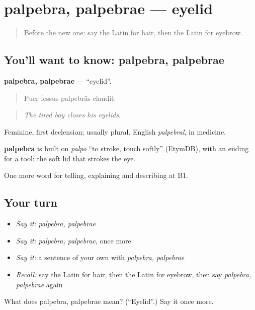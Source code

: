 \section[palpebra, palpebrae]{palpebra, palpebrae — eyelid}

\label{lesson:LA-C515-palpebra}



\begin{quote}
Before the new one: say the Latin for hair, then the Latin for eyebrow.
\end{quote}

\subsection*{You'll want to know: palpebra, palpebrae}
\textbf{palpebra, palpebrae} — \textquotedblleft{}eyelid\textquotedblright{}.

\begin{quote}
Puer fessus palpebrās claudit.
\end{quote}

\begin{quote}
\emph{The tired boy closes his eyelids.}
\end{quote}

Feminine, first declension; usually plural. English \emph{palpebral}, in medicine.

\begin{cousinweb}
\textbf{palpebra} is built on \emph{palpō} \textquotedblleft{}to stroke, touch softly\textquotedblright{} (EtymDB), with an ending for a tool: the soft lid that strokes the eye.
\end{cousinweb}

\begin{grammarlens}[title={What you've built}]
One more word for telling, explaining and describing at B1.
\end{grammarlens}

\subsection*{Your turn}
\begin{itemize}
\raggedright
  \item \emph{Say it:} \emph{palpebra, palpebrae}
  \item \emph{Say it:} \emph{palpebra, palpebrae}, once more
  \item \emph{Say it:} a sentence of your own with \emph{palpebra, palpebrae}
  \item \emph{Recall:} say the Latin for hair, then the Latin for eyebrow, then say \emph{palpebra, palpebrae} again
\end{itemize}

\begin{tcolorbox}[breakable,colback=teal!4,colframe=teal!35!black,title={Before you move on}]
What does palpebra, palpebrae mean? (\textquotedblleft{}Eyelid\textquotedblright{}.) Say it once more.
\end{tcolorbox}
